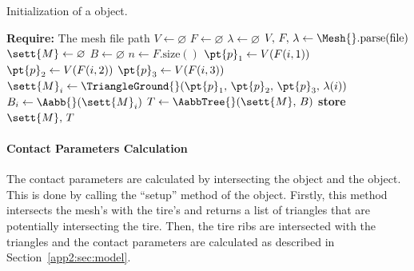 \begin{breakablealgorithm}
  \caption{Initialization of a \Mesh{} object.}
  \label{app2:alg:mesh}
  \begin{algorithmic}[1]
    \State \textbf{Require:} The mesh file path
     
      \State $V \gets \varnothing$ 
      \State $F \gets \varnothing$ 
      \State $\lambda \gets \varnothing$ 
      \State $V, \, F, \, \lambda \gets \Mesh{}.\text{parse}(\text{file})$ 
      \State $\sett{M} \gets \varnothing$ 
      \State $B \gets \varnothing$ 
      \State $n \gets F.\text{size}()$ 
        \State $\pt{p}_1 \gets V(F(i,1))$ 
        \State $\pt{p}_2 \gets V(F(i,2))$ 
        \State $\pt{p}_3 \gets V(F(i,3))$ 
        \State $\sett{M}_i \gets \TriangleGround{}(\pt{p}_1, \, \pt{p}_2, \, \pt{p}_3, \, \lambda(i))$ %
        \State $B_i \gets \Aabb{}(\sett{M}_i)$ 
      \EndFor
      \State $T \gets \AabbTree{}(\sett{M}, \, B)$ 
      \State \textbf{store} $\sett{M}, \, T$ 
    \EndFunction
  \end{algorithmic}
\end{breakablealgorithm}

\paragraph{Contact Parameters Calculation}
The contact parameters are calculated by intersecting the \Shell{} object and the \Mesh{} object. This is done by calling the ``setup'' method of the \Shell{} object. Firstly, this method intersects the mesh's \AabbTree{} with the tire's \Aabb{} and returns a list of triangles that are potentially intersecting the tire. Then, the tire ribs are intersected with the triangles and the contact parameters are calculated as described in Section~\ref{app2:sec:model}.

